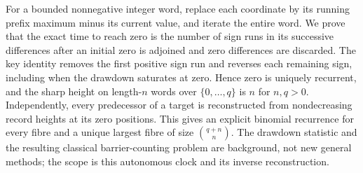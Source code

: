 For a bounded nonnegative integer word, replace each coordinate by its
running prefix maximum minus its current value, and iterate the entire
word. We prove that the exact time to reach zero is the number of sign
runs in its successive differences after an initial zero is adjoined and
zero differences are discarded. The key identity removes the first
positive sign run and reverses each remaining sign, including when the
drawdown saturates at zero. Hence zero is uniquely recurrent, and the
sharp height on length-$n$ words over $\{0,\ldots,q\}$ is $n$ for
$n,q>0$. Independently, every predecessor of a target is reconstructed
from nondecreasing record heights at its zero positions. This gives an
explicit binomial recurrence for every fibre and a unique largest fibre
of size $\binom{q+n}{n}$. The drawdown statistic and the resulting
classical barrier-counting problem are background, not new general
methods; the scope is this autonomous clock and its inverse reconstruction.
